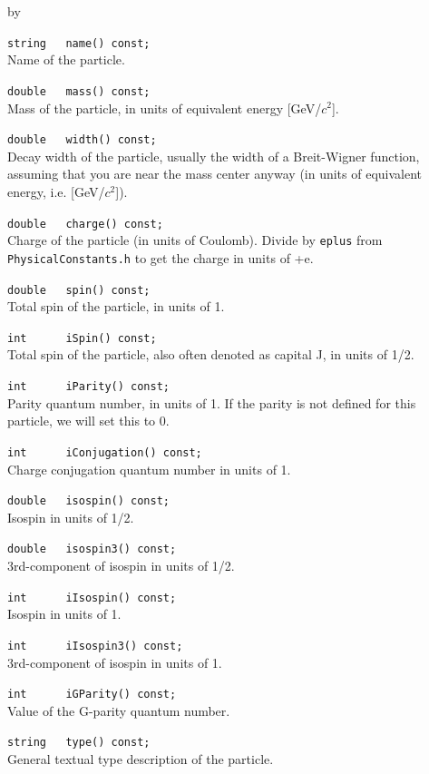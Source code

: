 \documentclass[twoside]{article}
\newcommand{\comp}[1]{\texttt{#1}}%
\newcommand{\entrylabel}[1]{\mbox{\textbf{{#1}}}\hfil}%
\newenvironment{entry}
{\begin{list}{}%
    {\renewcommand{\makelabel}{\entrylabel}%
     \setlength{\labelwidth}{90pt}%
     \setlength{\leftmargin}{\labelwidth}
     \advance\leftmargin by \labelsep%
      }%
    }%
  {\end{list}}
\newcommand{\Entrylabel}[1]%
{\raisebox{0pt}[1ex][0pt]{\makebox[\labelwidth][l]%
    {\parbox[t]{\labelwidth}{\hspace{0pt}\textbf{{#1}}}}}}
\newenvironment{Entry}%
{\renewcommand{\entrylabel}{\Entrylabel}\begin{entry}}%
  {\end{entry}}
\begin{document}
\begin{description}
\begin{Entry}
    \verb+string   name() const;+\\
    Name of the particle.
    
    \verb+double   mass() const;+\\
    Mass of the particle, in units of equivalent energy [GeV/$c^2$].
    
    \verb+double   width() const;+\\
    Decay width of the particle, usually the width of a
    Breit-Wigner function, assuming that you are near the
    mass center anyway (in units of equivalent energy, i.e. [GeV/$c^2$]).
    
    \verb+double   charge() const;+\\
    Charge of the particle (in units of Coulomb). Divide by \comp{eplus}
    from \comp{PhysicalConstants.h} to get the charge in units of +e.
    
    \verb+double   spin() const;+\\
    Total spin of the particle, in units of 1.
    
    \verb+int      iSpin() const;+\\
    Total spin of the particle, also often denoted as
    capital J, in units of 1/2.
    
    \verb+int      iParity() const;+\\ 
    Parity quantum number, in units of 1.
    If the parity is not defined for this particle,
    we will set this to 0.
    
    \verb+int      iConjugation() const;+\\
    Charge conjugation quantum number in units of 1.
    
    \verb+double   isospin() const;+\\
    Isospin in units of 1/2.
    
    \verb+double   isospin3() const;+\\ 
    3rd-component of isospin in units of 1/2.
    
    \verb+int      iIsospin() const;+\\
    Isospin in units of 1.
    
    \verb+int      iIsospin3() const;+\\ 
    3rd-component of isospin in units of 1.
    
    \verb+int      iGParity() const;+\\
    Value of the G-parity quantum number.
    
    \verb+string   type() const;+\\
    General textual type description of the particle.
    

\end{Entry}
\end{description}
\end{document}
